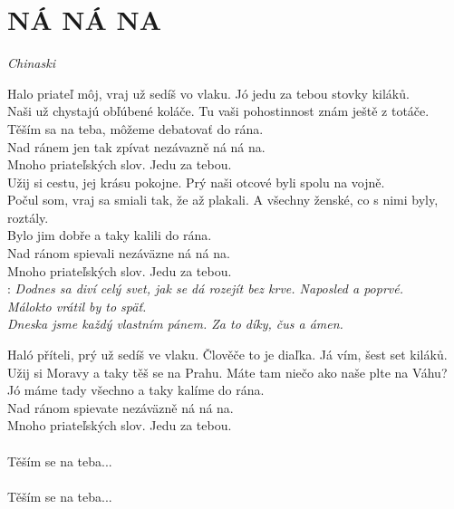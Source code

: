 \section*{\Huge NÁ NÁ NA}
\emph{Chinaski}\\

\begin{Large}

\textcolor{mygray}{Halo priateľ môj, vraj už sedíš vo vlaku.} Jó jedu za tebou stovky kiláků.\\
\textcolor{mygray}{Naši už chystajú obľúbené koláče.} Tu vaši pohostinnost znám ještě z totáče.\\

\textcolor{mygray}{Těším sa na teba, môžeme debatovať do rána.}\\
Nad ránem jen tak zpívat nezávazně ná ná na.\\
\textcolor{mygray}{Mnoho priateľských slov.} Jedu za tebou.\\

\textcolor{mygray}{Užij si cestu, jej krásu pokojne.} Prý naši otcové byli spolu na vojně.\\
\textcolor{mygray}{Počul som, vraj sa smiali tak, že až plakali.} A všechny ženské, co s nimi byly, roztály.\\

Bylo jim dobře a taky kalili do rána.\\
\textcolor{mygray}{Nad ránom spievali nezáväzne ná ná na.\\ 
Mnoho priateľských slov.} Jedu za tebou.\\

\textregistered: \emph{
\textcolor{mygray}{Dodnes sa diví celý svet,} jak se dá rozejít bez krve. Naposled a poprvé.\\
\textcolor{mygray}{Málokto vrátil by to späť.}\\
Dneska jsme každý vlastním pánem. Za to díky, čus a ámen.\\
}

Haló příteli, prý už sedíš ve vlaku. \textcolor{mygray}{Člověče to je diaľka.} Já vím, šest set kiláků.\\
Užij si Moravy a taky těš se na Prahu. \textcolor{mygray}{Máte tam niečo ako naše plte na Váhu?}\\ 

Jó máme tady všechno a taky kalíme do rána.\\
\textcolor{mygray}{Nad ránom spievate nezáväzně ná ná na.\\
Mnoho priateľských slov.} Jedu za tebou.\\

\textregistered\\
\textcolor{mygray}{Těším se na teba...}\\
\textregistered\\
\textcolor{mygray}{Těším se na teba...}

\end{Large}

\newpage
